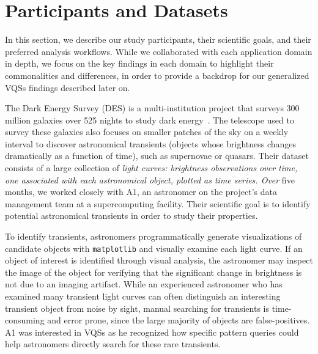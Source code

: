  \section{Participants and Datasets\label{sec:participantdatasets}}
 In this section, we describe our study participants, their scientific goals, and their preferred analysis workflows. %
 While we collaborated with each application domain in depth, we focus on the key findings in each domain to highlight their commonalities and differences, in order to provide a backdrop for our generalized VQSs findings described later on. 
 \par\noindent{} The Dark Energy Survey (DES) is a multi-institution project that surveys 300 million galaxies over 525 nights to study dark energy~\cite{Drlica-Wagner2017}. The telescope used to survey these galaxies also focuses on smaller patches of the sky on a weekly interval to discover astronomical transients (objects whose brightness changes dramatically as a function of time), such as supernovae or quasars. Their dataset consists of a large collection of \emph{light curves: brightness observations over time, one associated with each astronomical object, plotted as time series. Over} five months, we worked closely with A1, an astronomer on the project's data management team at a supercomputing facility. Their scientific goal is to identify potential astronomical transients in order to study their properties. 
 
 \npar To identify transients, astronomers programmatically generate visualizations of candidate objects with \texttt{matplotlib} and visually examine each light curve. If an object of interest is identified through visual analysis, the astronomer may inspect the image of the object for verifying that the significant change in brightness is not due to an imaging artifact. While an experienced astronomer who has examined many transient light curves can often distinguish an interesting transient object from noise by sight, manual searching for transients is time-consuming and error prone, since the large majority of objects are false-positives. A1 was interested in VQSs as he recognized how specific pattern queries could help astronomers directly search for these rare transients.
